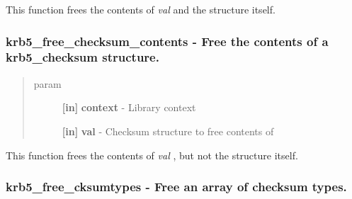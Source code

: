 \documentclass[letterpaper,10pt,english]{sphinxmanual}
\begin{document}
This function frees the contents of \emph{val} and the structure itself.


\subsubsection{krb5\_free\_checksum\_contents -  Free the contents of a krb5\_checksum structure.}
\label{appdev/refs/api/krb5_free_checksum_contents:krb5-free-checksum-contents-free-the-contents-of-a-krb5-checksum-structure}\label{appdev/refs/api/krb5_free_checksum_contents::doc}

\begin{fulllineitems}
\label{appdev/refs/api/krb5_free_checksum_contents:c.krb5_free_checksum_contents}
\end{fulllineitems}

\begin{quote}\begin{description}
\item[{param}] \leavevmode
\textbf{{[}in{]}} \textbf{context} - Library context

\textbf{{[}in{]}} \textbf{val} - Checksum structure to free contents of

\end{description}\end{quote}

This function frees the contents of \emph{val} , but not the structure itself.


\subsubsection{krb5\_free\_cksumtypes -  Free an array of checksum types.}
\label{appdev/refs/api/krb5_free_cksumtypes:krb5-free-cksumtypes-free-an-array-of-checksum-types}\label{appdev/refs/api/krb5_free_cksumtypes::doc}

\begin{fulllineitems}
\label{appdev/refs/api/krb5_free_cksumtypes:c.krb5_free_cksumtypes}
\end{fulllineitems}
\end{document}
